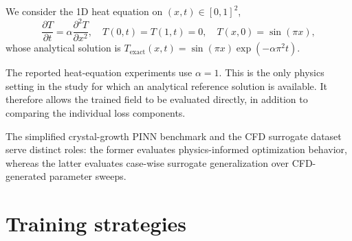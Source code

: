 \documentclass{article}
\begin{document}






We consider the 1D heat equation on $(x,t)\in[0,1]^2$,
\begin{equation}\label{eq:heat}
    \frac{\partial T}{\partial t}
    = \alpha\frac{\partial^2T}{\partial x^2},
    \quad
    T(0,t)=T(1,t)=0,
    \quad
    T(x,0)=\sin(\pi x),
\end{equation}
whose analytical solution is $T_{\mathrm{exact}}(x,t)=\sin(\pi x)\exp(-\alpha\pi^2t)$.

The reported heat-equation experiments use $\alpha=1$. This is the only physics setting in the study for which an analytical reference solution is available. It therefore allows the trained field to be evaluated directly, in addition to comparing the individual loss components.

The simplified crystal-growth PINN benchmark and the CFD surrogate dataset serve distinct roles: the former evaluates physics-informed optimization behavior, whereas the latter evaluates case-wise surrogate generalization over CFD-generated parameter sweeps.


\section{Training strategies}
\label{sec:strategies}
\label{sec:training_strategies}
\end{document}
